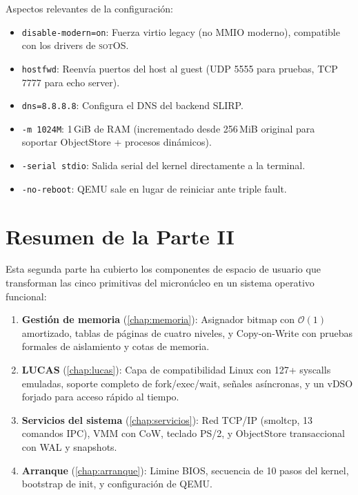 \documentclass[11pt,twoside,openright]{book}
\theoremstyle{definition}
\theoremstyle{plain}
\theoremstyle{remark}
\newcommand{\sotos}{\textsc{sotOS}}
\newcommand{\bigO}{\mathcal{O}}
\begin{document}
Aspectos relevantes de la configuración:
\begin{itemize}
    \item \texttt{disable-modern=on}: Fuerza virtio legacy (no MMIO moderno),
          compatible con los drivers de \sotos{}.
    \item \texttt{hostfwd}: Reenvía puertos del host al guest (UDP 5555 para
          pruebas, TCP 7777 para echo server).
    \item \texttt{dns=8.8.8.8}: Configura el DNS del backend SLIRP.
    \item \texttt{-m 1024M}: 1\,GiB de RAM (incrementado desde 256\,MiB original
          para soportar ObjectStore + procesos dinámicos).
    \item \texttt{-serial stdio}: Salida serial del kernel directamente a la terminal.
    \item \texttt{-no-reboot}: QEMU sale en lugar de reiniciar ante triple fault.
\end{itemize}

\section{Resumen de la Parte II}

Esta segunda parte ha cubierto los componentes de espacio de usuario que
transforman las cinco primitivas del micronúcleo en un sistema operativo
funcional:

\begin{enumerate}
    \item \textbf{Gestión de memoria} (\cref{chap:memoria}): Asignador bitmap
          con $\bigO(1)$ amortizado, tablas de páginas de cuatro niveles, y
          Copy-on-Write con pruebas formales de aislamiento y cotas de memoria.

    \item \textbf{LUCAS} (\cref{chap:lucas}): Capa de compatibilidad Linux con
          127+ syscalls emuladas, soporte completo de fork/exec/wait, señales
          asíncronas, y un vDSO forjado para acceso rápido al tiempo.

    \item \textbf{Servicios del sistema} (\cref{chap:servicios}): Red TCP/IP
          (smoltcp, 13 comandos IPC), VMM con CoW, teclado PS/2, y ObjectStore
          transaccional con WAL y snapshots.

    \item \textbf{Arranque} (\cref{chap:arranque}): Limine BIOS, secuencia de
          10 pasos del kernel, bootstrap de init, y configuración de QEMU.
\end{enumerate}
\end{document}
